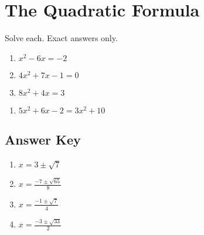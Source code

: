 \chapter{The Quadratic Formula}

Solve each. Exact answers only.

\begin{multicols}{3}
\begin{enumerate}
	\item $x^2-6x=-2$
	\item $4x^2 + 7x - 1 = 0$
    \item $8x^2 + 4x = 3$
\end{enumerate}	\setcounter{Review}{\value{enumi}}
\end{multicols}
\begin{multicols}{3}
\begin{enumerate}		\setcounter{enumi}{\value{Review}}
    \item $5x^2 + 6x - 2 = 3x^2 + 10$
\end{enumerate}	\setcounter{Review}{\value{enumi}}
\end{multicols}

\newpage

\section*{Answer Key}

\begin{enumerate}
	\item $x = 3 \pm \sqrt{7}$
	\item $x = \frac{-7 \pm \sqrt{65}}{8}$
    \item $x = \frac{-1 \pm \sqrt{7}}{4}$
    \item $x = \frac{-3 \pm \sqrt{33}}{2}$
\end{enumerate}